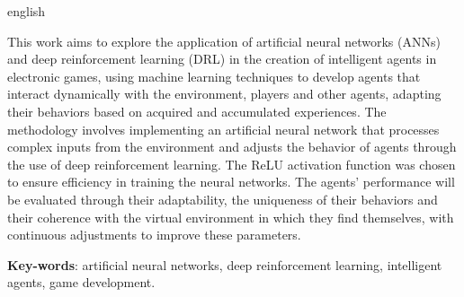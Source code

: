 \begin{resumo}[Abstract]
 \begin{otherlanguage*}{english}
   
  This work aims to explore the application of artificial neural networks (ANNs) and deep reinforcement learning (DRL) in the creation of intelligent agents in electronic games, using machine learning techniques to develop agents that interact dynamically with the environment, players and other agents, adapting their behaviors based on acquired and accumulated experiences. The methodology involves implementing an artificial neural network that processes complex inputs from the environment and adjusts the behavior of agents through the use of deep reinforcement learning. The ReLU activation function was chosen to ensure efficiency in training the neural networks. The agents' performance will be evaluated through their adaptability, the uniqueness of their behaviors and their coherence with the virtual environment in which they find themselves, with continuous adjustments to improve these parameters.

   \vspace{\onelineskip}
 
   \noindent 
   \textbf{Key-words}: artificial neural networks, deep reinforcement learning, intelligent agents, game development.
 \end{otherlanguage*}
\end{resumo}